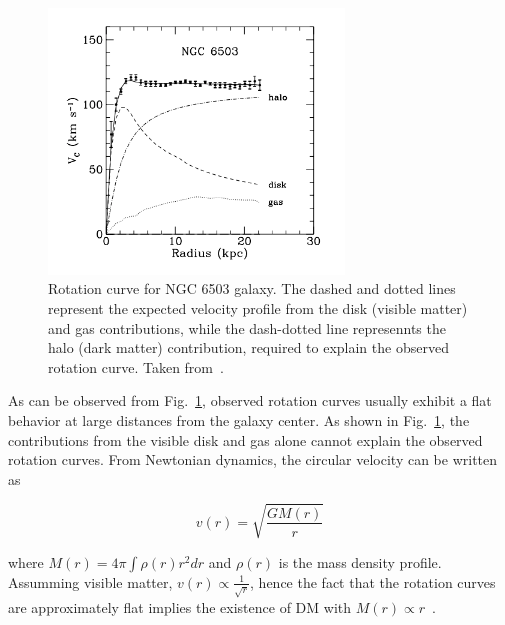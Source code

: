\begin{figure}[htbp]
    \centering
    \includegraphics[width=0.7\textwidth]{galaxy_rot_curve.png}
    \caption{Rotation curve for NGC 6503 galaxy. The dashed and dotted lines represent the expected velocity profile
    from the disk (visible matter) and gas contributions, while the dash-dotted line represennts the halo (dark matter)
    contribution, required to explain the observed rotation curve. Taken from~\cite{Bertone:2004pz}.}
    \label{fig:galaxy_rot_curve}
\end{figure}

As can be observed from Fig.~\ref{fig:galaxy_rot_curve}, observed rotation curves usually exhibit a flat behavior at
large distances from the galaxy center. As shown in Fig.~\ref{fig:galaxy_rot_curve}, the contributions from the visible
disk and gas alone cannot explain the observed rotation curves. From Newtonian dynamics, the circular velocity can be
written as

\begin{equation}
    v(r) = \sqrt{\frac{G M(r)}{r}}
\end{equation}

where $M(r) = 4\pi \int \rho(r) r^{2} dr$ and $\rho(r)$ is the mass density profile. Assumming visible matter, $v(r) \propto \frac{1}{\sqrt{r}}$,
hence the fact that the rotation curves are approximately flat implies the existence of DM with $M(r) \propto r$~\cite{Bertone:2004pz}.


